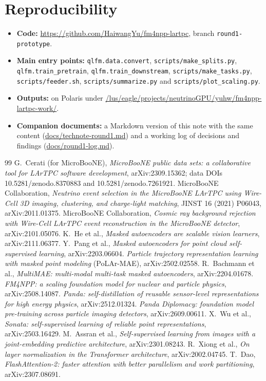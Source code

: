 \documentclass[11pt,a4paper]{article}
\newcommand{\code}[1]{\texttt{\small #1}}
\begin{document}
\section*{Reproducibility}
\begin{itemize}
  \item \textbf{Code:} \url{https://github.com/HaiwangYu/fm4npp-lartpc}, branch \code{round1-prototype}.
  \item \textbf{Main entry points:} \code{qlfm.data.convert}, \code{scripts/make\_splits.py}, \code{qlfm.train\_pretrain}, \code{qlfm.train\_downstream}, \code{scripts/make\_tasks.py}, \code{scripts/feeder.sh}, \code{scripts/summarize.py} and \code{scripts/plot\_scaling.py}.
  \item \textbf{Outputs:} on Polaris under \url{/lus/eagle/projects/neutrinoGPU/yuhw/fm4npp-lartpc-work/}.
  \item \textbf{Companion documents:} a Markdown version of this note with the same content (\url{docs/technote-round1.md}) and a working log of decisions and findings (\url{docs/round1-log.md}).
\end{itemize}

\begin{thebibliography}{99}\small
{} G.~Cerati (for MicroBooNE), \emph{MicroBooNE public data sets: a collaborative tool for LArTPC software development}, arXiv:2309.15362; data DOIs 10.5281/zenodo.8370883 and 10.5281/zenodo.7261921.
 MicroBooNE Collaboration, \emph{Neutrino event selection in the MicroBooNE LArTPC using Wire-Cell 3D imaging, clustering, and charge-light matching}, JINST 16 (2021) P06043, arXiv:2011.01375.
 MicroBooNE Collaboration, \emph{Cosmic ray background rejection with Wire-Cell LArTPC event reconstruction in the MicroBooNE detector}, arXiv:2101.05076.
 K.~He et al., \emph{Masked autoencoders are scalable vision learners}, arXiv:2111.06377.
 Y.~Pang et al., \emph{Masked autoencoders for point cloud self-supervised learning}, arXiv:2203.06604.
 \emph{Particle trajectory representation learning with masked point modeling} (PoLAr-MAE), arXiv:2502.02558.
 R.~Bachmann et al., \emph{MultiMAE: multi-modal multi-task masked autoencoders}, arXiv:2204.01678.
 \emph{FM4NPP: a scaling foundation model for nuclear and particle physics}, arXiv:2508.14087.
 \emph{Panda: self-distillation of reusable sensor-level representations for high energy physics}, arXiv:2512.01324.
 \emph{Panda Diplomacy: foundation model pre-training across particle imaging detectors}, arXiv:2609.00611.
 X.~Wu et al., \emph{Sonata: self-supervised learning of reliable point representations}, arXiv:2503.16429.
 M.~Assran et al., \emph{Self-supervised learning from images with a joint-embedding predictive architecture}, arXiv:2301.08243.
 R.~Xiong et al., \emph{On layer normalization in the Transformer architecture}, arXiv:2002.04745.
 T.~Dao, \emph{FlashAttention-2: faster attention with better parallelism and work partitioning}, arXiv:2307.08691.
\end{thebibliography}
\end{document}
